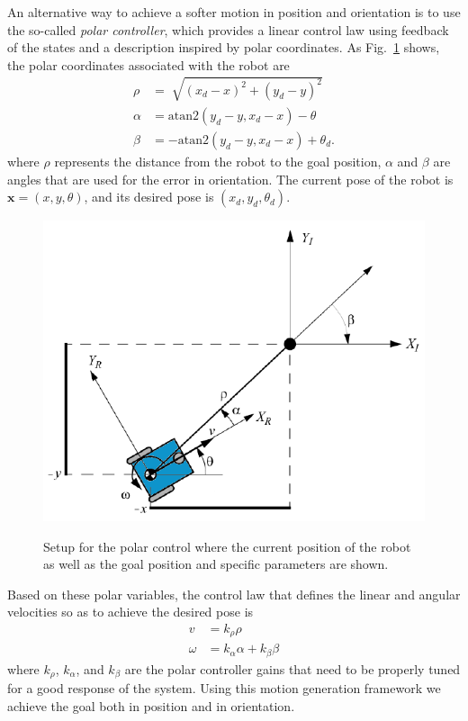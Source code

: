 \documentclass[conference]{IEEEtran}
\newcommand{\x}{\mathbf x}
\begin{document}
An alternative way to achieve a softer motion in position and orientation is to
use the so-called \textit{polar controller}, which provides a linear control
law using feedback of the states and a description inspired by polar
coordinates. As Fig.~\ref{fig:Polar} shows, the polar coordinates associated
with the robot are
\begin{align*}
  \rho &= \sqrt[]{(x_{d} - x)^2 + (y_{d} - y)^2}  \\
  \alpha &= \text{atan2}(y_{d} - y, x_{d} - x) - \theta  \\
  \beta &= -\text{atan2}(y_{d} - y, x_{d} - x) + \theta_{d}.
\end{align*}
where $\rho$ represents the distance from the robot to the goal position,
$\alpha$ and $\beta$ are angles that are used for the error in orientation. The
current pose of the robot is $\x=(x,y,\theta)$, and its desired pose is
$(x_d,y_d,\theta_d)$. 
\begin{figure}%
 \centering \footnotesize
  \subfloat
  {\includegraphics[width=0.7\linewidth]{control_polar.png}}
  \captionsetup{font=footnotesize}
 \caption{Setup for the polar control where the current position of the robot
   as well as the goal position and specific parameters are shown.}
 \label{fig:Polar}
\end{figure}
Based on these polar variables, the control law that defines the linear and
angular velocities so as to achieve the desired pose is
\begin{align}
  \label{eq:v}
  v &= k_{\rho}\rho \\
  \label{eq:w}
  \omega &= k_{\alpha}\alpha + k_{\beta}\beta
\end{align}
where $k_{\rho}$, $k_{\alpha}$, and $k_{\beta}$ are the polar controller gains
that need to be properly tuned for a good response of the system. Using this
motion generation framework we achieve the goal both in position and in
orientation.
\end{document}
